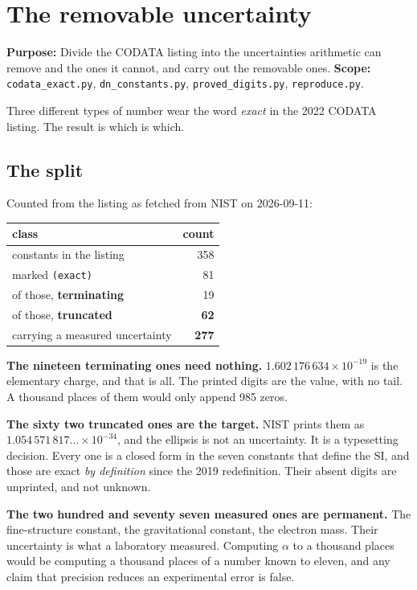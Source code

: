 
\chapter{The removable uncertainty}

\textbf{Purpose:} Divide the CODATA listing into the uncertainties arithmetic can remove and the
ones it cannot, and carry out the removable ones. \textbf{Scope:}
\texttt{codata\_exact.py}, \texttt{dn\_constants.py}, \texttt{proved\_digits.py},
\texttt{reproduce.py}.

Three different types of number wear the word \emph{exact} in the 2022 CODATA listing. The result is
which is which.

\section{The split}

Counted from the listing as fetched from NIST on 2026-09-11:

\begin{center}
\begin{tabular}{lr}
\toprule
class & count \\
\midrule
constants in the listing & 358 \\
marked \texttt{(exact)} & 81 \\
\quad of those, \textbf{terminating} & 19 \\
\quad of those, \textbf{truncated} & \textbf{62} \\
carrying a measured uncertainty & \textbf{277} \\
\bottomrule
\end{tabular}
\end{center}

\textbf{The nineteen terminating ones need nothing.} \(1.602\,176\,634 \times 10^{-19}\) is the
elementary charge, and that is all. The printed digits are the value, with no tail.
A thousand places of them would only append 985 zeros.

\textbf{The sixty two truncated ones are the target.} NIST prints them as
\(1.054\,571\,817\ldots \times 10^{-34}\), and the ellipsis is not an uncertainty. It is a
typesetting decision. Every one is a closed form in the seven constants that define the SI, and those are
exact \emph{by definition} since the 2019 redefinition. Their absent digits are unprinted, and not
unknown.

\textbf{The two hundred and seventy seven measured ones are permanent.} The fine-structure constant,
the gravitational constant, the electron mass. Their uncertainty is what a laboratory measured.
Computing \(\alpha\) to a thousand places would be computing a thousand places of a number known to
eleven, and any claim that precision reduces an experimental error is false.

